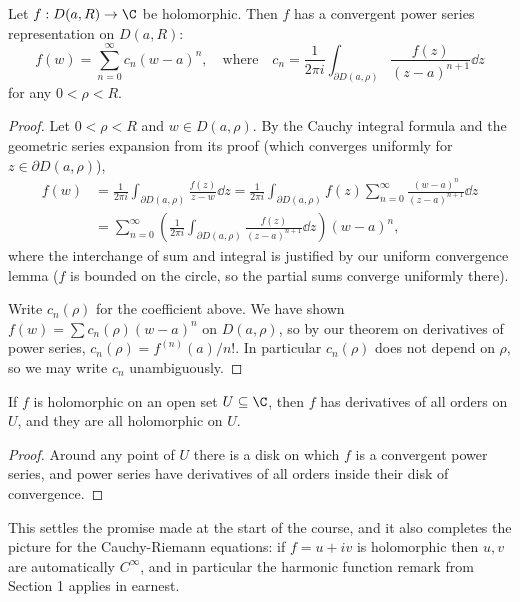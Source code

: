 \begin{theorem}
    Let $f: D(a, R) \rightarrow \C$ be holomorphic. Then $f$ has a convergent power series representation on $D(a, R)$:
    $$
    f(w) = \sum_{n = 0}^{\infty} c_n (w - a)^n, \quad \text{where} \quad c_n = \frac{1}{2 \pi i} \int_{\partial D(a, \rho)} \frac{f(z)}{(z - a)^{n + 1}} \dd z
    $$
    for any $0 < \rho < R$.
\end{theorem}
\begin{proof}
    Let $0 < \rho < R$ and $w \in D(a, \rho)$. By the Cauchy integral formula and the geometric series expansion from its proof (which converges uniformly for $z \in \partial D(a, \rho)$),
    \begin{align*}
        f(w) &= \frac{1}{2 \pi i} \int_{\partial D(a, \rho)} \frac{f(z)}{z - w} \dd z
        = \frac{1}{2 \pi i} \int_{\partial D(a, \rho)} f(z) \sum_{n = 0}^{\infty} \frac{(w - a)^n}{(z - a)^{n + 1}} \dd z \\
        &= \sum_{n = 0}^{\infty} \left(\frac{1}{2 \pi i} \int_{\partial D(a, \rho)} \frac{f(z)}{(z - a)^{n + 1}} \dd z \right) (w - a)^n,
    \end{align*}
    where the interchange of sum and integral is justified by our uniform convergence lemma ($f$ is bounded on the circle, so the partial sums converge uniformly there).

    Write $c_n(\rho)$ for the coefficient above. We have shown $f(w) = \sum c_n(\rho) (w - a)^n$ on $D(a, \rho)$, so by our theorem on derivatives of power series, $c_n(\rho) = f^{(n)}(a)/n!$. In particular $c_n(\rho)$ does not depend on $\rho$, so we may write $c_n$ unambiguously.
\end{proof}

\begin{corollary}
    If $f$ is holomorphic on an open set $U \subseteq \C$, then $f$ has derivatives of all orders on $U$, and they are all holomorphic on $U$.
\end{corollary}
\begin{proof}
    Around any point of $U$ there is a disk on which $f$ is a convergent power series, and power series have derivatives of all orders inside their disk of convergence.
\end{proof}

This settles the promise made at the start of the course, and it also completes the picture for the Cauchy-Riemann equations: if $f = u + iv$ is holomorphic then $u, v$ are automatically $C^\infty$, and in particular the harmonic function remark from Section 1 applies in earnest.

